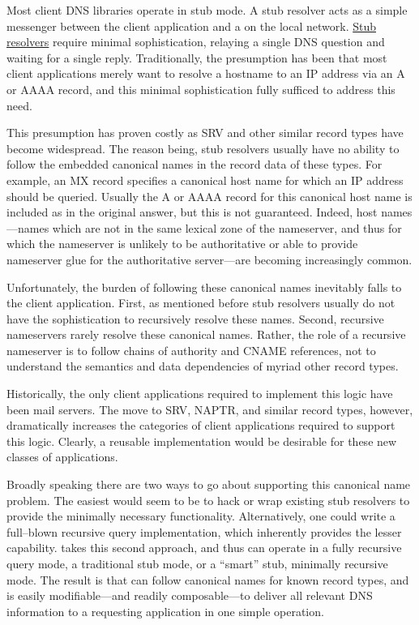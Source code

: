 \documentclass[11pt]{article}
\begin{document}
Most client DNS libraries operate in stub mode. A stub resolver acts as a
simple messenger between the client application and a  on the local network. \hyperref[stub resolver]{Stub
resolvers} require minimal sophistication, relaying a
single DNS question and waiting for a single reply. Traditionally, the
presumption has been that most client applications merely want to resolve a
hostname to an IP address via an A or AAAA record, and this minimal
sophistication fully sufficed to address this need.

This presumption has proven costly as SRV and other similar record types
have become widespread. The reason being, stub resolvers usually have no
ability to follow the embedded canonical names in the record data of these
types. For example, an MX record specifies a canonical host name for which
an IP address should be queried. Usually the A or AAAA record for this
canonical host name is included as  in the original answer, but
this is not guaranteed. Indeed,  host names---names
which are not in the same lexical zone of the nameserver, and thus for which
the nameserver is unlikely to be authoritative or able to provide nameserver
glue for the authoritative server---are becoming increasingly common.

Unfortunately, the burden of following these canonical names inevitably
falls to the client application. First, as mentioned before stub resolvers
usually do not have the sophistication to recursively resolve these names.
Second, recursive nameservers rarely resolve these canonical names. Rather,
the role of a recursive nameserver is to follow chains of authority and
CNAME references, not to understand the semantics and data dependencies of
myriad other record types.

Historically, the only client applications required to implement this logic
have been mail servers. The move to SRV, NAPTR, and similar record types,
however, dramatically increases the categories of client applications
required to support this logic. Clearly, a reusable implementation would be
desirable for these new classes of applications.

Broadly speaking there are two ways to go about supporting this canonical
name problem. The easiest would seem to be to hack or wrap existing stub
resolvers to provide the minimally necessary functionality. Alternatively,
one could write a full--blown recursive query implementation, which
inherently provides the lesser capability. \dnsc takes this second approach,
and thus can operate in a fully recursive query mode, a traditional stub
mode, or a ``smart'' stub, minimally recursive mode. The result is that
\dnsc can follow canonical names for known record types, and is easily
modifiable---and readily composable---to deliver all relevant DNS
information to a requesting application in one simple operation.
\end{document}
